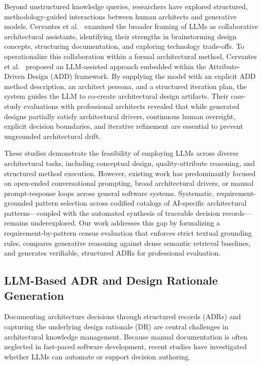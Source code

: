 Beyond unstructured knowledge queries, researchers have explored structured,
methodology-guided interactions between human architects and generative models.
Cervantes et al.~\cite{cervantes2026assistants} examined the broader framing
of LLMs as collaborative architectural assistants, identifying their strengths
in brainstorming design concepts, structuring documentation, and exploring
technology trade-offs. To operationalize this collaboration within a formal
architectural method, Cervantes et al.~\cite{cervantes2025add} proposed an
LLM-assisted approach embedded within the Attribute-Driven Design (ADD) framework.
By supplying the model with an explicit ADD method description, an architect persona,
and a structured iteration plan, the system guides the LLM to co-create
architectural design artifacts. Their case-study evaluations with professional
architects revealed that while generated designs partially satisfy architectural
drivers, continuous human oversight, explicit decision boundaries, and iterative
refinement are essential to prevent ungrounded architectural drift.

These studies demonstrate the feasibility of employing LLMs across diverse
architectural tasks, including conceptual design, quality-attribute reasoning,
and structured method execution. However, existing work has predominantly focused
on open-ended conversational prompting, broad architectural drivers, or manual
prompt-response loops across general software systems.
Systematic, requirement-grounded pattern selection across codified catalogs of
AI-specific architectural patterns---coupled with the automated synthesis of
traceable decision records---remains underexplored.
Our work addresses this gap by formalizing a requirement-by-pattern census
evaluation that enforces strict textual grounding rules, compares generative
reasoning against dense semantic retrieval baselines, and generates verifiable,
structured ADRs for professional evaluation.

\subsection{LLM-Based ADR and Design Rationale Generation}
\label{sec:related-work-adr}

Documenting architecture decisions through structured records (ADRs) and
capturing the underlying design rationale (DR) are central challenges in
architectural knowledge management. Because manual documentation is often
neglected in fast-paced software development, recent studies have investigated
whether LLMs can automate or support decision authoring.


